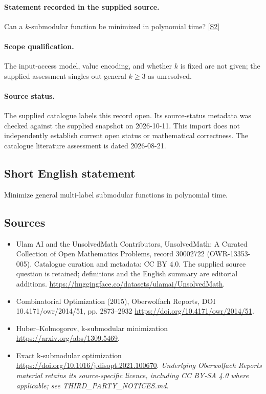 \documentclass[11pt]{article}
\begin{document}
\paragraph{Statement recorded in the supplied source.}
Can a $k$-submodular function be minimized in polynomial time? \href{https://doi.org/10.4171/owr/2014/51}{[S2]}
\paragraph{Scope qualification.}
The input-access model, value encoding, and whether $k$ is fixed are not given; the supplied assessment singles out general $k\geq3$ as unresolved.
\paragraph{Source status.}
The supplied catalogue labels this record open. Its source-status metadata was checked against the supplied snapshot on 2026-10-11. This import does not independently establish current open status or mathematical correctness. The catalogue literature assessment is dated 2026-08-21.
\subsection{Short English statement}
Minimize general multi-label submodular functions in polynomial time.
\subsection{Sources}
\begin{itemize}
\item[S1] Ulam AI and the UnsolvedMath Contributors, UnsolvedMath: A Curated Collection of Open Mathematics Problems, record 30002722 (OWR-13353-005). Catalogue curation and metadata: CC BY 4.0. The supplied source question is retained; definitions and the English summary are editorial additions.
\url{https://huggingface.co/datasets/ulamai/UnsolvedMath}.
\item[S2] Combinatorial Optimization (2015), Oberwolfach Reports, DOI 10.4171/owr/2014/51, pp. 2873--2932
\url{https://doi.org/10.4171/owr/2014/51}.
\item[S3] Huber--Kolmogorov, k-submodular minimization
\url{https://arxiv.org/abs/1309.5469}.
\item[S4] Exact k-submodular optimization
\url{https://doi.org/10.1016/j.disopt.2021.100670}.
\textit{Underlying Oberwolfach Reports material retains its source-specific licence, including CC BY-SA 4.0 where applicable; see THIRD\_PARTY\_NOTICES.md.}
\end{itemize}
\end{document}
